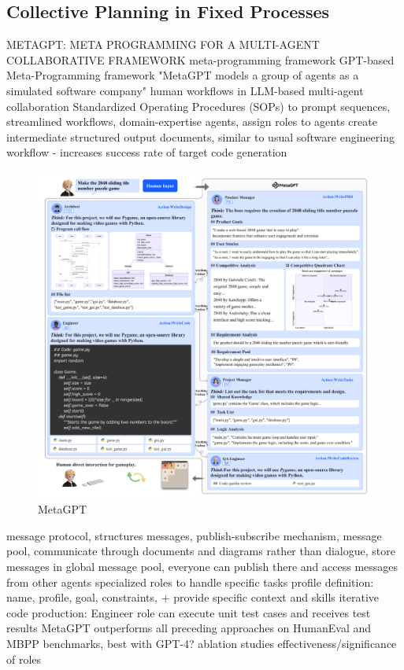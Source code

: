 \documentclass{article}
\begin{document}
\subsection{Collective Planning in Fixed Processes}
\cite{hong_metagpt_2023} METAGPT: META PROGRAMMING FOR A MULTI-AGENT COLLABORATIVE FRAMEWORK
meta-programming framework
GPT-based Meta-Programming framework
"MetaGPT models a group of agents as a simulated software company"
human workflows in LLM-based multi-agent collaboration
Standardized Operating Procedures (SOPs) to prompt sequences, streamlined workflows, domain-expertise agents, assign roles to agents
create intermediate structured output documents, similar to usual software engineering workflow - increases success rate of target code generation
\begin{figure}[h]
	\centering
	\includegraphics[width=1.0\linewidth]{MetaGPT.png}
	\caption[]{ MetaGPT \cite{hong_metagpt_2023}}
	\label{fig:metagpt}
\end{figure}
message protocol, structures messages, publish-subscribe mechanism, message pool, communicate through documents and diagrams rather than dialogue, store messages in global message pool, everyone can publish there and access messages from other agents
specialized roles to handle specific tasks
profile definition: name, profile, goal, constraints, + provide specific context and skills
iterative code production: Engineer role can execute unit test cases and receives test results
MetaGPT outperforms all preceding approaches on HumanEval and MBPP benchmarks, best with GPT-4?
ablation studies effectiveness/significance of roles
\end{document}
